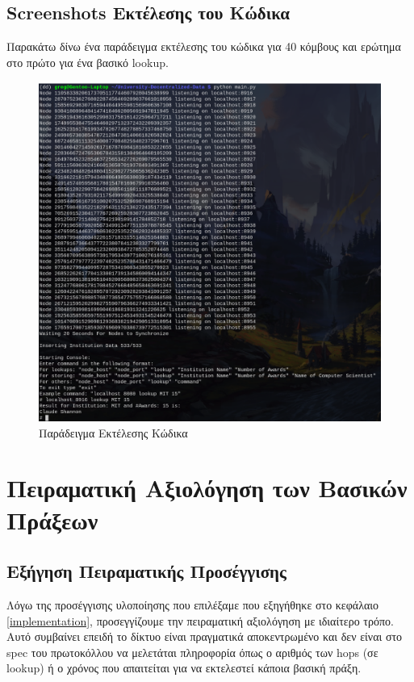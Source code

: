 \documentclass[12pt,a4paper]{article}
\begin{document}
\subsection{Screenshots Εκτέλεσης του Κώδικα}

Παρακάτω δίνω ένα παράδειγμα εκτέλεσης του κώδικα για 40 κόμβους και ερώτημα στο πρώτο για ένα βασικό lookup.
\begin{figure}[H]
	\includegraphics[width=\textwidth]{images/code_execution_example.png}
	\caption{Παράδειγμα Εκτέλεσης Κώδικα}
	\label{code_execution_example}
\end{figure}

\section{Πειραματική Αξιολόγηση των Βασικών Πράξεων}

\subsection{Εξήγηση Πειραματικής Προσέγγισης}
\label{experimental_methodology}

Λόγω της προσέγγισης υλοποίησης που επιλέξαμε που εξηγήθηκε στο κεφάλαιο \ref{implementation}, προσεγγίζουμε την πειραματική αξιολόγηση με ιδιαίτερο τρόπο. Αυτό συμβαίνει επειδή το δίκτυο είναι πραγματικά αποκεντρωμένο και δεν είναι στο spec του πρωτοκόλλου να μελετάται πληροφορία όπως ο αριθμός των hops (σε lookup) ή ο χρόνος που απαιτείται για να εκτελεστεί κάποια βασική πράξη.
\end{document}
